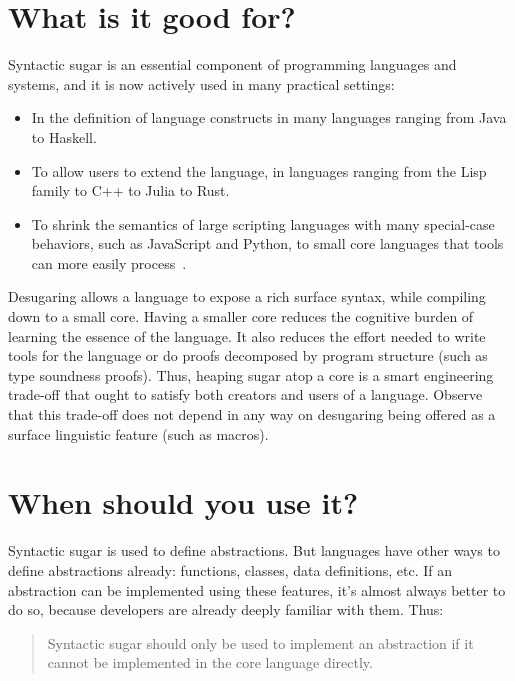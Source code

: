 \section{What is it good for?}

Syntactic sugar is an essential component of programming languages and
systems, and it is now actively used in many practical settings:
\begin{itemize}
\item In the definition of language constructs in many languages
  ranging from Java to Haskell.
\item To allow users to extend the language, in languages ranging from the Lisp
  family to C++ to Julia to Rust.
\item To shrink the semantics of large scripting languages with many
  special-case behaviors, such as JavaScript and Python, to small core
  languages that tools can more easily process~\cite{lambda-js,politz:s5,politz:python}.
\end{itemize}
Desugaring allows a language to expose a rich surface syntax, while
compiling down to a small core. Having a smaller core reduces the
cognitive burden of learning the essence of the language. It also
reduces the effort needed to write tools for the language or do proofs
decomposed by program structure (such as type soundness proofs). Thus,
heaping sugar atop a core is a smart engineering trade-off that ought
to satisfy both creators and users of a language. Observe that this
trade-off does not depend in any way on desugaring being offered as a
surface linguistic feature (such as macros).


\section{When should you use it?}

Syntactic sugar is used to define abstractions. But languages have
other ways to define abstractions already: functions, classes, data
definitions, etc. If an abstraction can be implemented using these
features, it's almost always better to do so, because developers are
already deeply familiar with them. Thus:
\begin{quote}
  Syntactic sugar should only be used to implement an abstraction if
  it cannot be implemented in the core language directly.
\end{quote}

